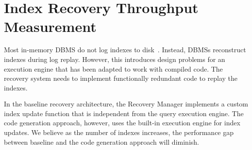 \documentclass[12pt]{cmuthesis}
\begin{document}
\section{Index Recovery Throughput Measurement}
\label{insert_index_test}

Most in-memory DBMS do not log indexes to disk~\cite{hekaton2013, noisepage, malviya14, silo_r}. Instead, DBMSs reconstruct indexes during log replay. However, this introduces design problems for an execution engine that has been adapted to work with compiled code. The recovery system needs to implement functionally redundant code to replay the indexes.

In the baseline recovery architecture, the Recovery Manager implements a custom index update function that is independent from the query execution engine. The code generation approach, however, uses the built-in execution engine for index updates. We believe as the number of indexes increases, the performance gap between baseline and the code generation approach will diminish.
\end{document}
